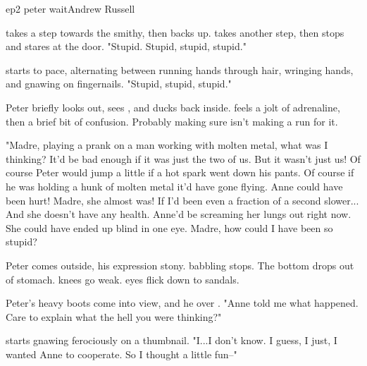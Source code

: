 \documentclass{book}
\begin{document}
\begin{childnode}{ep2 peter wait}{Andrew Russell}


    \name{} takes a step towards the smithy, then backs up. \HeShe{} takes another step, then stops and stares at the door. "Stupid. Stupid, stupid, stupid."

    \HeShe{} starts to pace, alternating between running \hisher{} hands through \hisher{} hair, wringing \hisher{} hands, and gnawing on \hisher{} fingernails. "Stupid, stupid, stupid." 

    Peter briefly looks out, sees \name{}, and ducks back inside. \name{} feels a jolt of adrenaline, then a brief bit of confusion. Probably making sure \name{} isn't making a run for it. 

    "Madre, playing a prank on a man working with molten metal, what was I thinking? It'd be bad enough if it was just the two of us. But it wasn't just us! Of course Peter would jump a little if a hot spark went down his pants. Of course if he was holding a 
    hunk of molten metal it'd have gone flying.
    Anne could have been hurt! 
    Madre, she almost was! If I'd been even a fraction of a second slower... And she doesn't have any health. Anne'd be screaming her lungs out right now. She could have ended up blind in one eye. Madre, how could I have been so stupid? 

    Peter comes outside, his expression stony. \names{} babbling stops. The bottom drops out of \hisher{} stomach. \HisHer{} knees go weak. \HisHer{} eyes flick down to \hisher{} sandals.

    Peter's heavy boots come into \names{} view, and he  over \name{}. "Anne told me what happened. Care to explain what the hell you were thinking?" 

    \name{} starts gnawing ferociously on a thumbnail. "I...I don't know. I guess, I just, I wanted Anne to cooperate. So I thought a little fun--"


\end{childnode}
\end{document}
